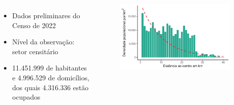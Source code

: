 \documentclass[%
    9pt, 
    aspectratio=169,
]{beamer}
\begin{document}
\begin{frame}
\begin{columns}
        \begin{itemize}
            \item Dados preliminares do Censo de 2022
            \item Nível da observação: setor censitário
            \item 11.451.999 de habitantes e 4.996.529 de domicílios, dos quais 4.316.336 estão ocupados
        \end{itemize}
        \begin{figure}
            \centering
            \includegraphics[width = .7\textwidth]{imagens/densidade_distcentro.pdf}
        \end{figure}
    \end{columns}
\end{frame}
\end{document}

